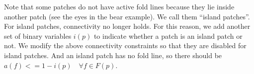 Note that some patches do not have active fold lines because they lie inside another patch (see the eyes in the bear example). We call them ``island patches''. For island patches, connectivity no longer holds. For this reason, we add another set of binary variables $i(p)$ to indicate whether a patch is an island patch or not. We modify the above connectivity constraints so that they are disabled for island patches. And an island patch has no fold line, so there should be $a(f) <= 1 - i(p) \quad \forall f \in F(p)$.

